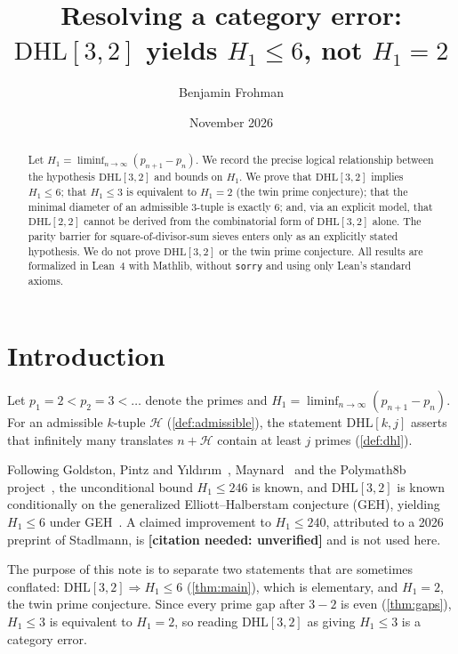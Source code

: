 \documentclass[11pt]{amsart}
\title[DHL\texorpdfstring{$[3,2]$}{[3,2]} yields \texorpdfstring{$H_1\le 6$}{H1<=6}, not \texorpdfstring{$H_1=2$}{H1=2}]{Resolving a category error: \texorpdfstring{$\mathrm{DHL}[3,2]$}{DHL[3,2]} yields \texorpdfstring{$H_1 \le 6$}{H1 <= 6}, not \texorpdfstring{$H_1=2$}{H1 = 2}}
\author{Benjamin Frohman}
\date{November 2026}
\theoremstyle{plain}
\theoremstyle{definition}
\theoremstyle{remark}
\newcommand{\DHL}{\mathrm{DHL}}
\begin{document}
\begin{abstract}
Let $H_1=\liminf_{n\to\infty}(p_{n+1}-p_n)$. We record the precise logical relationship between the hypothesis $\DHL[3,2]$ and bounds on $H_1$. We prove that $\DHL[3,2]$ implies $H_1\le 6$; that $H_1\le 3$ is equivalent to $H_1=2$ (the twin prime conjecture); that the minimal diameter of an admissible $3$-tuple is exactly $6$; and, via an explicit model, that $\DHL[2,2]$ cannot be derived from the combinatorial form of $\DHL[3,2]$ alone. The parity barrier for square-of-divisor-sum sieves enters only as an explicitly stated hypothesis. We do not prove $\DHL[3,2]$ or the twin prime conjecture. All results are formalized in Lean~4 with Mathlib, without \texttt{sorry} and using only Lean's standard axioms.
\end{abstract}
\maketitle
{}\par


\section{Introduction}\label{sec:intro}

Let $p_1=2<p_2=3<\dots$ denote the primes and $H_1=\liminf_{n\to\infty}(p_{n+1}-p_n)$. For an admissible $k$-tuple $\mathcal H$ (\cref{def:admissible}), the statement $\DHL[k,j]$ asserts that infinitely many translates $n+\mathcal H$ contain at least $j$ primes (\cref{def:dhl}).

Following Goldston, Pintz and Y{\i}ld{\i}r{\i}m~\cite{GPY}, Maynard~\cite{Maynard15} and the Polymath8b project~\cite{Polymath}, the unconditional bound $H_1\le 246$ is known, and $\DHL[3,2]$ is known conditionally on the generalized Elliott--Halberstam conjecture (GEH), yielding $H_1\le 6$ under GEH~\cite{Polymath}. A claimed improvement to $H_1\le 240$, attributed to a 2026 preprint of Stadlmann, is \textbf{[citation needed: unverified]} and is not used here.

The purpose of this note is to separate two statements that are sometimes conflated: $\DHL[3,2]\Rightarrow H_1\le 6$ (\cref{thm:main}), which is elementary, and $H_1=2$, the twin prime conjecture. Since every prime gap after $3-2$ is even (\cref{thm:gaps}), $H_1\le 3$ is equivalent to $H_1=2$, so reading $\DHL[3,2]$ as giving $H_1\le 3$ is a category error.
\end{document}
